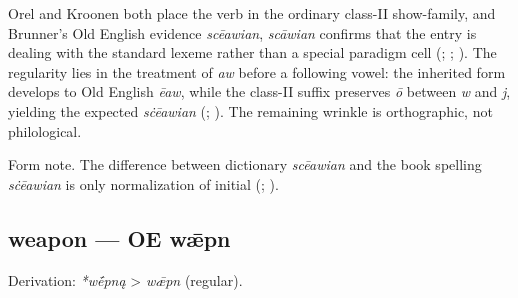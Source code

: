 \documentclass[
  british,
  a4paper,
]{article}
\begin{document}
Orel and Kroonen both place the verb in the ordinary class-II
show-family, and Brunner's Old English evidence \emph{scēawian},
\emph{scāwian} confirms that the entry is dealing with the standard
lexeme rather than a special paradigm cell (; ;
). The regularity
lies in the treatment of \emph{aw} before a following vowel: the
inherited form develops to Old English \emph{ēaw}, while the class-II
suffix preserves \emph{ō} between \emph{w} and \emph{j}, yielding the
expected \emph{sċēawian} (; ). The remaining wrinkle is
orthographic, not philological.

Form note. The difference between dictionary \emph{scēawian} and the
book spelling \emph{sċēawian} is only normalization of initial
(;
).

\subsection{weapon --- OE wǣpn}\label{weapon-oe-wux1e3pn}

Derivation: \emph{*wḗpną} \textgreater{} \emph{wǣpn} (regular).

\begingroup
\setlength{\fboxsep}{6pt}
\end{document}
